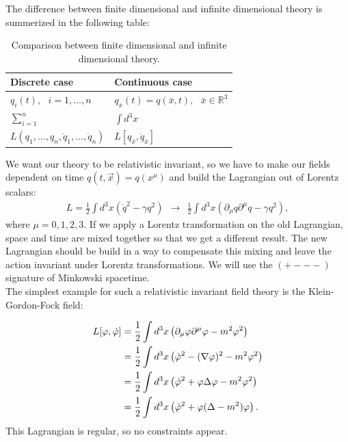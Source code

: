 The difference between finite dimensional and infinite dimensional theory is summerized in the following table: 

\begin{table}[H]
\begin{tabular}{>{\centering}p{} | >{\centering}p{}} 
Discrete case \vspace{5pt} & Continuous case \vspace{5pt} \tabularnewline \hline 
\vspace{5pt} $q_i(t), \ \ \ i=1, \dots, n$ & \vspace{5pt} $q_{\bar{x}}(t) = q(\bar{x},t), \ \ \ \bar{x} \in \mathbb{R}^3$ \tabularnewline 
\vspace{3pt} $\sum_{i=1}^n$ & \vspace{3pt} $\int d^3 x$ \tabularnewline 
\vspace{3pt} $L(q_1, \dots, q_n, \dot{q}_1, \dots, \dot{q}_n)$ & \vspace{3pt} $L[q_{\bar{x}}, \dot{q}_{\bar{x}}]$ \tabularnewline 
\end{tabular}
\caption{Comparison between finite dimensional and infinite dimensional theory.}
\end{table}

We want our theory to be relativistic invariant, so we have to make our fields dependent on time $q(t, \vec{x}) = q(x^{\mu})$ and build the Lagrangian out of Lorentz scalars:
\begin{align}
L = \frac{1}{2} \int d^3 x \left( \dot{q}^2 - \gamma q^2 \right) \ \ \longrightarrow \ \ \frac{1}{2} \int d^3 x \left( \partial_{\mu} q \partial^{\mu} q - \gamma q^2 \right),
\end{align}
where $\mu = 0,1,2,3$. If we apply a Lorentz transformation on the old Lagrangian, space and time are mixed together so that we get a different result. The new Lagrangian should be build in a way to compensate this mixing and leave the action invariant under Lorentz transformations. We will use the $(+ - - -)$ signature of Minkowski spacetime. \\
The simplest example for such a relativistic invariant field theory is the Klein-Gordon-Fock field:

\begin{example}
\begin{align}
L[\varphi, \dot{\varphi}] &= \frac{1}{2} \int d^3 x \left( \partial_{\mu} \varphi \partial^{\mu} \varphi - m^2 \varphi^2 \right) \notag \\
&= \frac{1}{2} \int d^3 x \left( \dot{\varphi}^2 - (\nabla \varphi)^2 - m^2 \varphi^2 \right) \notag \\
&= \frac{1}{2} \int d^3 x \left( \dot{\varphi}^2 + \varphi \Delta \varphi - m^2 \varphi^2 \right) \notag \\
&= \frac{1}{2} \int d^3 x \left( \dot{\varphi}^2 + \varphi (\Delta - m^2) \varphi \right).
\end{align}
This Lagrangian is regular, so no constraints appear.
\end{example}

